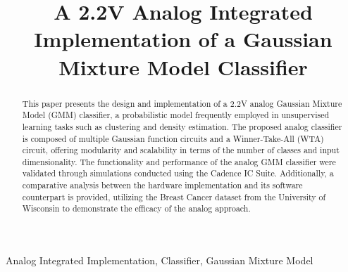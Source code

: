 \documentclass[conference]{IEEEtran}
\begin{document}
\title{A 2.2V Analog Integrated Implementation of a Gaussian Mixture Model Classifier}
\author{
}
\maketitle

\begin{abstract}
This paper presents the design and implementation of a 2.2V analog Gaussian Mixture Model (GMM) classifier, a probabilistic model frequently employed in unsupervised learning tasks such as clustering and density estimation. The proposed analog classifier is composed of multiple Gaussian function circuits and a Winner-Take-All (WTA) circuit, offering modularity and scalability in terms of the number of classes and input dimensionality. The functionality and performance of the analog GMM classifier were validated through simulations conducted using the Cadence IC Suite. Additionally, a comparative analysis between the hardware implementation and its software counterpart is provided, utilizing the Breast Cancer dataset from the University of Wisconsin to demonstrate the efficacy of the analog approach.
\end{abstract}

\begin{IEEEkeywords}
Analog Integrated Implementation, Classifier, Gaussian Mixture Model
\end{IEEEkeywords}
\end{document}

